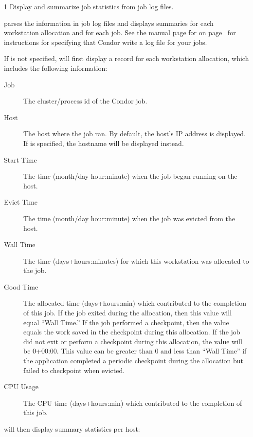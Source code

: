 \begin{ManPage}{\label{man-condor-userlog}}{1}
{Display and summarize job statistics from job log files.}
\Synopsis {}

\Description
{} parses the information in job log files and displays
summaries for each workstation allocation and for each job.  See the
manual page for  on page~\pageref{man-condor-submit} for
instructions for specifying that Condor write a log file for your
jobs.

If  is not specified,  will first display
a record for each workstation allocation, which includes the following
information:

\begin{description}
\item[Job] The cluster/process id of the Condor job.
\item[Host] The host where the job ran.  By default, the host's IP
address is displayed.  If  is specified, the hostname
will be displayed instead.
\item[Start Time] The time (month/day hour:minute) when the job began
running on the host.
\item[Evict Time] The time (month/day hour:minute) when
the job was evicted from the host.
\item[Wall Time] The time (days+hours:minutes) for which this workstation was
allocated to the job.
\item[Good Time] The allocated time (days+hours:min) which
contributed to the completion of this job.  If the job exited during
the allocation, then this value will equal ``Wall Time.''  If the job
performed a checkpoint, then the value equals the work saved in
the checkpoint during this allocation.  If the job did not exit or
perform a checkpoint during this allocation, the value will be 0+00:00.
This value can be greater than 0 and less than ``Wall Time'' if the
application completed a periodic checkpoint during the allocation but
failed to checkpoint when evicted.
\item[CPU Usage] The CPU time (days+hours:min) which contributed to
the completion of this job.
\end{description}

 will then display summary statistics per host:


\end{ManPage}

